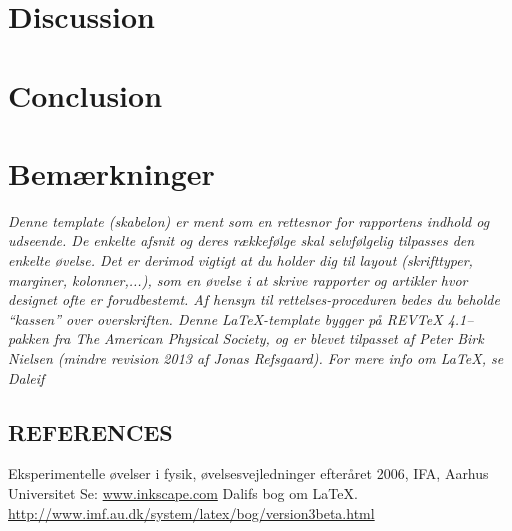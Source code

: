 \documentclass[english,a4paper,twocolumn,amsmath,amssymb,floatfix]{revtex4-1}
\begin{document}


\section*{Discussion}


\section*{Conclusion}

\appendix
\section*{Bemærkninger}
\textsl{ Denne template (skabelon) er ment som en rettesnor for rapportens indhold og udseende. De enkelte afsnit og deres rækkefølge skal selvfølgelig tilpasses den enkelte øvelse. Det er derimod vigtigt at du holder dig til layout (skrifttyper, marginer, kolonner,...), som en øvelse i at skrive rapporter og artikler hvor designet ofte er forudbestemt. Af hensyn til rettelses-proceduren bedes du beholde \enquote{kassen} over overskriften. Denne \LaTeX-template bygger på REVTeX 4.1--pakken fra The American Physical Society, og er blevet tilpasset af Peter Birk Nielsen (mindre revision 2013 af Jonas Refsgaard). For mere info om \LaTeX{}, se Daleif \cite{Daleif}}

\begin{thebibliography}{99}
\section*{REFERENCES}

Eksperimentelle øvelser i fysik, øvelsesvejledninger efteråret 2006, IFA, Aarhus Universitet
	Se: \url{www.inkscape.com}
	Dalifs bog om \LaTeX. \url{http://www.imf.au.dk/system/latex/bog/version3beta.html}

\end{thebibliography}
\end{document}
